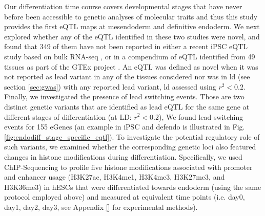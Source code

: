 Our differentiation time course covers developmental stages that have never before been accessible to genetic analyses of molecular traits and thus this study provides the first eQTL maps at mesendoderm and definitive endoderm.
We next explored whether any of the eQTL identified in these two studies were novel, and found that 349 of them have not been reported in either a recent iPSC eQTL study based on bulk RNA-seq \cite{mirauta2018population}, or in a compendium of eQTL identified from 49 tissues as part of the GTEx project \cite{gtex2017genetic}.
An eQTL was defined as novel when it was not reported as lead variant in any of the tissues considered nor was in \gls{ld} (see section \ref{sec:gwas}) with any reported lead variant, \gls{ld} assessed using $r^2<0.2$.\\

Finally, we investigated the presence of lead switching events.
Those are two distinct genetic variants that are identified as lead eQTL for the same gene at different stages of differentiation (at LD: $r^2<0.2$),
We found lead switching events for 155 eGenes (an example in iPSC and defendo is illustrated in Fig. \ref{fig:endodiff_stage_specific_eqtl}). 
To investigate the potential regulatory role of such variants, we examined whether the corresponding genetic loci also featured changes in histone modifications during differentiation. 
Specifically, we used ChIP-Sequencing to profile five histone modifications associated with promoter and enhancer usage (H3K27ac, H3K4me1, H3K4me3, H3K27me3, and H3K36me3) in hESCs that were differentiated towards endoderm (using the same protocol employed above) and measured at equivalent time points (i.e. day0, day1, day2, day3, see Appendix \ref{} for experimental methods). 

